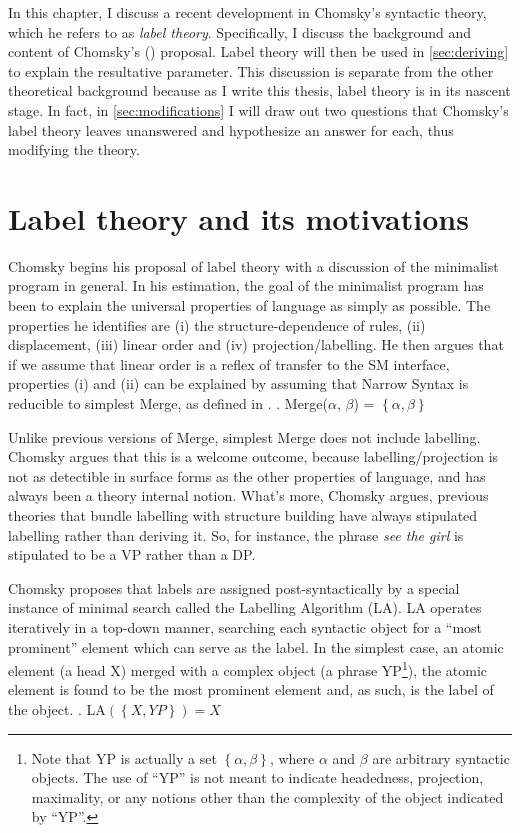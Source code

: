 In this chapter, I discuss a recent development in Chomsky's syntactic theory, which he refers to as \textit{label theory}.
Specifically, I discuss the background and content of Chomsky's (\citeyear{chomsky2013problems,chomsky2015problems}) proposal.
Label theory will then be used in \cref{sec:deriving} to explain the resultative parameter.
This discussion is separate from the other theoretical background because as I write this thesis, label theory is in its nascent stage.
In fact, in \cref{sec:modifications} I will draw out two questions that Chomsky's label theory leaves unanswered and hypothesize an answer for each, thus modifying the theory.
\section{Label theory and its motivations}
Chomsky begins his proposal of label theory with a discussion of the minimalist program in general.
In his estimation, the goal of the minimalist program has been to explain the universal properties of language as simply as possible.
The properties he identifies are (i) the structure-dependence of rules, (ii) displacement, (iii) linear order and (iv) projection/labelling.
He then argues that if we assume that linear order is a reflex of transfer to the SM interface, properties (i) and (ii) can be explained by assuming that Narrow Syntax is reducible to simplest Merge, as defined in \Next.
\ex. Merge($\alpha$, $\beta$) = $\left\{ \alpha, \beta \right\}$

Unlike previous versions of Merge, simplest Merge does not include labelling.
Chomsky argues that this is a welcome outcome, because labelling/projection is not as detectible in surface forms as the other properties of language, and has always been a theory internal notion.
What's more, Chomsky argues, previous theories that bundle labelling with structure building have always stipulated labelling rather than deriving it.
So, for instance, the phrase \textit{see the girl} is stipulated to be a VP rather than a DP.

Chomsky proposes that labels are assigned post-syntactically by a special instance of minimal search called the Labelling Algorithm (LA).
LA operates iteratively in a top-down manner, searching each syntactic object for a ``most prominent'' element which can serve as the label.
In the simplest case, an atomic element (a head X) merged with a complex object (a phrase YP\footnote{
		Note that YP is actually a set $\left\{ \alpha,\beta \right\}$, where $\alpha$ and $\beta$ are arbitrary syntactic objects.
		The use of ``YP'' is not meant to indicate headedness, projection, maximality, or any notions other than the complexity of the object indicated by ``YP''. 
}), the atomic element is found to be the most prominent element and, as such, is the label of the object.
\ex. LA$(\left\{ X, YP \right\}) = X$


